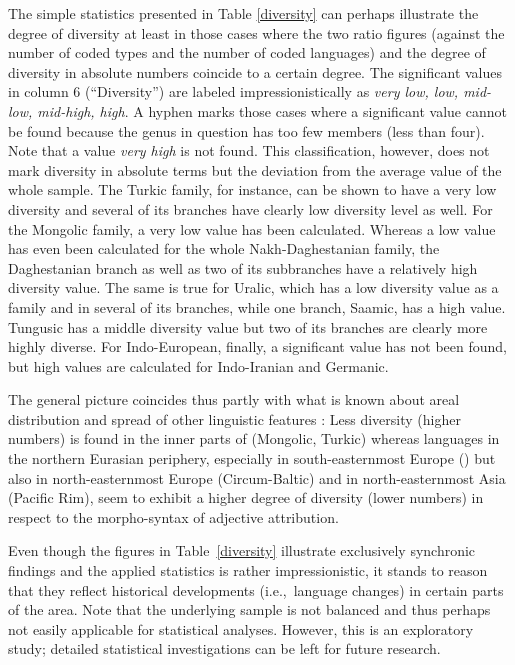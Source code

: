 The simple statistics presented in Table \ref{diversity} can perhaps illustrate the degree of diversity at least in those cases where the two ratio figures (against the number of coded types and the number of coded languages) and the degree of diversity in absolute numbers coincide to a certain degree. The significant values in column 6 (“Diversity”) are labeled impressionistically as \textit{very low, low, mid-low, mid-high, high}. A hyphen marks those cases where a significant value cannot be found because the genus in question has too few members (less than four). Note that a value \textit{very high} is not found. This classification, however, does not mark diversity in absolute terms but the deviation from the average value of the whole sample. The Turkic family, for instance, can be shown to have a very low diversity and several of its branches have clearly low diversity level as well. For the Mongolic family, a very low value has been calculated. Whereas a low value has even been calculated for the whole Nakh-Daghestanian family, the Daghestanian branch as well as two of its subbranches have a relatively high diversity value. The same is true for Uralic, which has a low diversity value as a family and in several of its branches, while one branch, Saamic, has a high value. Tungusic has a middle diversity value but two of its branches are clearly more highly diverse. For Indo-European, finally, a significant value has not been found, but high values are calculated for Indo-Iranian and Germanic.

The general picture coincides thus partly with what is known about areal distribution and spread of other linguistic features \citep[cf., e.g.,][]{nichols1992}: Less diversity (higher numbers) is found in the inner parts of  (Mongolic, Turkic) whereas languages in the northern Eurasian periphery, especially in south-easternmost Europe () but also in north-easternmost Europe (Circum-Baltic) and in north-easternmost Asia (Pacific Rim), seem to exhibit a higher degree of diversity (lower numbers) in respect to the morpho-syntax of adjective attribution.

Even though the figures in Table~\ref{diversity} illustrate exclusively synchronic findings and the applied statistics is rather impressionistic, it stands to reason that they reflect historical developments (i.e.,~language changes) in certain parts of the area. Note that the underlying sample is not balanced and thus perhaps not easily applicable for statistical analyses. However, this is an exploratory study; detailed statistical investigations can be left for future research.

